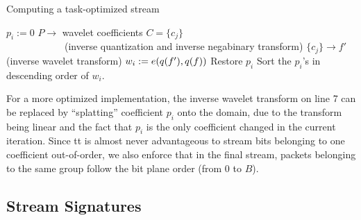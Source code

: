 \vspace{-0.5em}
\begin{algorithm}[h]
  \caption{Computing a task-optimized stream}
  \begin{algorithmic}[1]
			\State $p_i := 0$
      \State $P \rightarrow$ wavelet coefficients $C=\{c_j\}$\\
      		\ \ \ \ \ \ \ \ \ \ \ \ (inverse quantization and inverse negabinary transform)
			\State $\{c_j\} \rightarrow f'$ (inverse wavelet transform)
			\State $w_i := e(q(f'),q(f))$			
			\State Restore $p_i$
		\EndFor
		\State Sort the $p_i$'s in descending order of $w_i$.
	\end{algorithmic}
	\label{alg:greedy}
\end{algorithm}

\vspace{-0.5em}
For a more optimized implementation, the inverse wavelet transform on line 7 can be replaced by
``splatting'' coefficient $p_i$ onto the domain, due to the transform being linear and the fact that
$p_i$ is the only coefficient changed in the current iteration. Since tt is almost never
advantageous to stream bits belonging to one coefficient out-of-order, we also enforce that in the
final stream, packets belonging to the same group follow the bit plane order (from $0$ to $B$).

\subsection{Stream Signatures} \label{sec:stream-signature}

